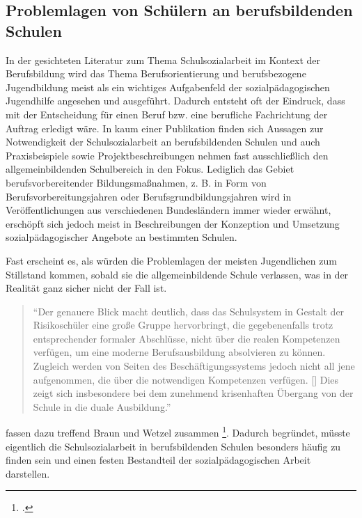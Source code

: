 \subsection{Problemlagen von Schülern an berufsbildenden Schulen}
\label{sec:ProblemlagenVonSchülernAnBerufsbildendenSchulen}

In der gesichteten Literatur zum Thema Schulsozialarbeit im Kontext der Berufsbildung wird das Thema Berufsorientierung und berufsbezogene Jugendbildung meist als ein wichtiges Aufgabenfeld der sozialpädagogischen Jugendhilfe angesehen und ausgeführt. Dadurch entsteht oft der Eindruck, dass mit der Entscheidung für einen Beruf bzw. eine berufliche Fachrichtung der Auftrag erledigt wäre. In kaum einer Publikation finden sich Aussagen zur Notwendigkeit der Schulsozialarbeit an berufsbildenden Schulen und auch Praxisbeispiele sowie Projektbeschreibungen nehmen fast ausschließlich den allgemeinbildenden Schulbereich in den Fokus. Lediglich das Gebiet berufsvorbereitender Bildungsmaßnahmen, z. B. in Form von Berufsvorbereitungsjahren oder Berufsgrundbildungsjahren wird in Veröffentlichungen aus verschiedenen Bundesländern immer wieder erwähnt, erschöpft sich jedoch meist in Beschreibungen der Konzeption und Umsetzung sozialpädagogischer Angebote an bestimmten Schulen.

Fast erscheint es, als würden die Problemlagen der meisten Jugendlichen zum Stillstand kommen, sobald sie die allgemeinbildende Schule verlassen, was in der Realität ganz sicher nicht der Fall ist. 

\begin{quotation}
\noindent
"`Der genauere Blick macht deutlich, dass das Schulsystem in Gestalt der Risikoschüler eine große Gruppe hervorbringt, die gegebenenfalls trotz entsprechender formaler Abschlüsse, nicht über die realen Kompetenzen verfügen, um eine moderne Berufsausbildung absolvieren zu können. Zugleich werden von Seiten des Beschäftigungssystems jedoch nicht all jene aufgenommen, die über die notwendigen Kompetenzen verfügen. [\punkte] Dies zeigt sich insbesondere bei dem zunehmend krisenhaften Übergang von der Schule in die duale Ausbildung."'
\end{quotation}

\noindent
[\punkte] fassen dazu treffend  Braun und Wetzel zusammen \footcite[181]{Braun2006}. Dadurch begründet, müsste eigentlich die Schulsozialarbeit in berufsbildenden Schulen besonders häufig zu finden sein und einen festen Bestandteil der sozialpädagogischen Arbeit darstellen.

